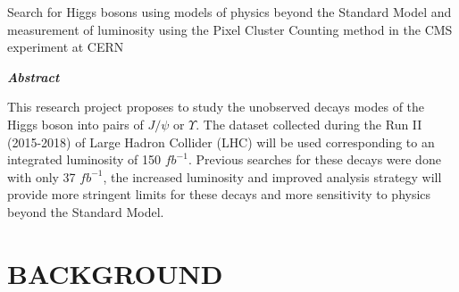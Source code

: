 \documentclass[final,3p]{CSP}
\def\ProjectTitleEnglish{Search for Higgs bosons using models of physics beyond the Standard Model and measurement of luminosity using the Pixel Cluster Counting method in the CMS experiment at CERN}
\begin{document}
\shipout\null


\newpage
\hspace{2pt}

\begin{adjustwidth}{1cm}{1cm}

  \begin{center}
    {\Large \ProjectTitleEnglish \par}
    \vspace{1cm}
    {\itshape\textbf{Abstract}\par}
  \end{center}
  
  \vspace{1 cm}
 


\onehalfspacing This research project proposes to study the unobserved decays modes of the Higgs boson into pairs of $J/\psi$ or $\Upsilon$.  The dataset collected during the Run II (2015-2018) of Large Hadron Collider (LHC) will be used corresponding to an integrated luminosity of 150 $fb^{-1}$. Previous searches for these decays were done with only 37 $fb^{-1}$, the increased luminosity and improved analysis strategy will provide more stringent limits for these decays and more sensitivity to physics beyond the Standard Model.




\end{adjustwidth}

\hspace{2pt}
\vfill

\newpage
\section{BACKGROUND}
\end{document}
